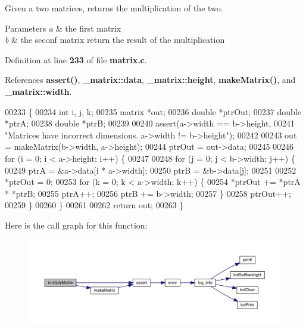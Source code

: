 Given a two matrices, returns the multiplication of the two. 


\begin{DoxyParams}{Parameters}
{\em a} & the first matrix \\
\hline
{\em b} & the seconf matrix return the result of the multiplication \\
\hline
\end{DoxyParams}


Definition at line \textbf{ 233} of file \textbf{ matrix.\+c}.



References \textbf{ assert()}, \textbf{ \+\_\+matrix\+::data}, \textbf{ \+\_\+matrix\+::height}, \textbf{ make\+Matrix()}, and \textbf{ \+\_\+matrix\+::width}.


\begin{DoxyCode}
00233                                              \{
00234   \textcolor{keywordtype}{int} i, j, k;
00235   matrix *out;
00236   \textcolor{keywordtype}{double} *ptrOut;
00237   \textcolor{keywordtype}{double} *ptrA;
00238   \textcolor{keywordtype}{double} *ptrB;
00239 
00240   assert(a->width == b->height,
00241          \textcolor{stringliteral}{"Matrices have incorrect dimensions. a->width != b->height"});
00242 
00243   out = makeMatrix(b->width, a->height);
00244   ptrOut = out->data;
00245 
00246   \textcolor{keywordflow}{for} (i = 0; i < a->height; i++) \{
00247 
00248     \textcolor{keywordflow}{for} (j = 0; j < b->width; j++) \{
00249       ptrA = &a->data[i * a->width];
00250       ptrB = &b->data[j];
00251 
00252       *ptrOut = 0;
00253       \textcolor{keywordflow}{for} (k = 0; k < a->width; k++) \{
00254         *ptrOut += *ptrA * *ptrB;
00255         ptrA++;
00256         ptrB += b->width;
00257       \}
00258       ptrOut++;
00259     \}
00260   \}
00261 
00262   \textcolor{keywordflow}{return} out;
00263 \}
\end{DoxyCode}
Here is the call graph for this function\+:
\nopagebreak
\begin{figure}[H]
\begin{center}
\leavevmode
\includegraphics[width=350pt]{matrix_8h_a63ed5c518b34768e9ef8e9d5f7d0b534_cgraph}
\end{center}
\end{figure}
\mbox{\label{matrix_8h_a50ab2b1ac33d6993d93522fc4f30a051}} 
